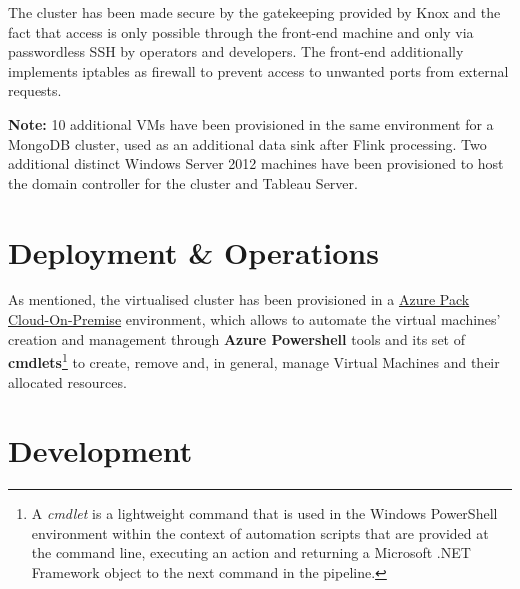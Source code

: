 The cluster has been made secure by the gatekeeping provided by Knox and the fact that access is only possible through the front-end machine and only via passwordless SSH by operators and developers. The front-end additionally implements iptables as firewall to prevent access to unwanted ports from external requests.

\textbf{Note:} 10 additional VMs have been provisioned in the same environment for a MongoDB cluster, used as an additional data sink after Flink processing. Two additional distinct Windows Server 2012 machines have been provisioned to host the domain controller for the cluster and Tableau Server.

\section{Deployment \& Operations}

As mentioned, the virtualised cluster has been provisioned in a \href{https://www.microsoft.com/it-it/cloud-platform/windows-azure-pack}{Azure Pack Cloud-On-Premise} environment, which allows to automate the virtual machines' creation and management through \textbf{Azure Powershell} tools and its set of \textbf{cmdlets}\footnote{A \textit{cmdlet} is a lightweight command that is used in the Windows PowerShell environment within the context of automation scripts that are provided at the command line, executing an action and returning a Microsoft .NET Framework object to the next command in the pipeline.} to create, remove and, in general, manage Virtual Machines and their allocated resources.






\pagebreak
\section{Development}









